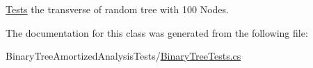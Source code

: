 \hyperlink{namespace_binary_tree_amortized_analyis_1_1_tests}{Tests} the transverse of random tree with 100 Nodes. 



The documentation for this class was generated from the following file\+:\begin{DoxyCompactItemize}
\item 
Binary\+Tree\+Amortized\+Analysis\+Tests/\hyperlink{_binary_tree_tests_8cs}{Binary\+Tree\+Tests.\+cs}\end{DoxyCompactItemize}
